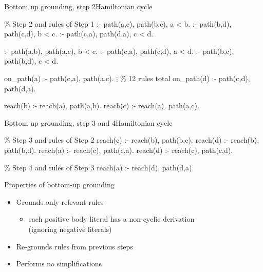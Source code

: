 \begin{frame}{Bottom up grounding, step 2}{Hamiltonian cycle}
  \begin{SemiVerbatim}[\small]{.9}
    {\color{comment}\% Step 2 \alert{and} rules of Step 1}
    :- \alert{path(a,c)}, \alert{path(b,c)}, a < b.
    :- \alert{path(b,d)}, \alert{path(c,d)}, b < c.
    :- \alert{path(c,a)}, \alert{path(d,a)}, c < d.

    :- \alert{path(a,b)}, \alert{path(a,c)}, b < c.
    :- \alert{path(c,a)}, \alert{path(c,d)}, a < d.
    :- \alert{path(b,c)}, \alert{path(b,d)}, c < d.

    on_path(a) :- \alert{path(c,a)}, \alert{path(a,c)}.
    \(\vdots\) {\color{comment}\% 12 rules total}
    on_path(d) :- \alert{path(c,d)}, \alert{path(d,a)}.

    reach(b) :- \alert{reach(a)}, \alert{path(a,b)}.
    reach(c) :- \alert{reach(a)}, \alert{path(a,c)}.
  \end{SemiVerbatim}
\end{frame}
\begin{frame}{Bottom up grounding, step 3 and 4}{Hamiltonian cycle}
  \bigskip
  \begin{SemiVerbatim}{.9}
    {\color{comment}\% Step 3 \alert{and} rules of Step 2}
    reach(c) :- \alert{reach(b)}, path(b,c).
    reach(d) :- \alert{reach(b)}, path(b,d).
    reach(a) :- \alert{reach(c)}, path(c,a).
    reach(d) :- \alert{reach(c)}, path(c,d).

      {\color{comment}\% Step 4 \alert{and} rules of Step 3}
    reach(a) :- \alert{reach(d)}, path(d,a).
  \end{SemiVerbatim}
\end{frame}
\begin{frame}{Properties of bottom-up grounding}
  \bigskip
  \begin{itemize}
    \item Grounds only \alert{relevant} rules
          \begin{itemize}\normalsize
            \item each positive body literal has a non-cyclic derivation \\
                  (ignoring negative literals)
          \end{itemize}
          \smallskip
    \item \alert{Re-grounds} rules from previous steps
          \medskip
    \item Performs no \alert{simplifications}
  \end{itemize}
\end{frame}
